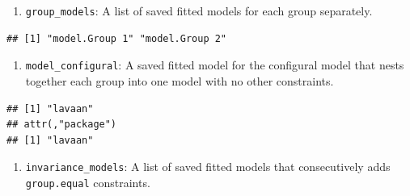\documentclass[
  man]{apa7}
\newenvironment{Shaded}{\begin{snugshade}}{\end{snugshade}}
\newcommand{\FunctionTok}[1]{\textcolor[rgb]{0.13,0.29,0.53}{\textbf{#1}}}
\newcommand{\NormalTok}[1]{#1}
\newcommand{\SpecialCharTok}[1]{\textcolor[rgb]{0.81,0.36,0.00}{\textbf{#1}}}
\providecommand{\tightlist}{%
  \setlength{\itemsep}{0pt}\setlength{\parskip}{0pt}}
\begin{document}
\begin{enumerate}
\def\labelenumi{\arabic{enumi})}
\setcounter{enumi}{3}
\tightlist
\item
  \texttt{group\_models}: A list of saved fitted models for each group separately.
\end{enumerate}

\small

\begin{Shaded}
\end{Shaded}

\normalsize

\begin{verbatim}
## [1] "model.Group 1" "model.Group 2"
\end{verbatim}

\begin{enumerate}
\def\labelenumi{\arabic{enumi})}
\setcounter{enumi}{4}
\tightlist
\item
  \texttt{model\_configural}: A saved fitted model for the configural model that nests together each group into one model with no other constraints.
\end{enumerate}

\small

\begin{Shaded}
\end{Shaded}

\normalsize

\begin{verbatim}
## [1] "lavaan"
## attr(,"package")
## [1] "lavaan"
\end{verbatim}

\begin{enumerate}
\def\labelenumi{\arabic{enumi})}
\setcounter{enumi}{5}
\tightlist
\item
  \texttt{invariance\_models}: A list of saved fitted models that consecutively adds \texttt{group.equal} constraints.
\end{enumerate}

\small

\begin{Shaded}
\end{Shaded}
\end{document}
